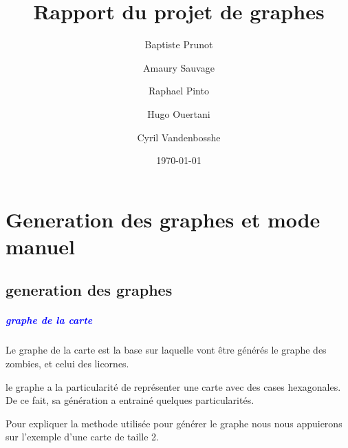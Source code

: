 \documentclass{report}
\title{Rapport du projet de graphes}
\author{Baptiste Prunot
\and Amaury Sauvage
\and Raphael Pinto
\and Hugo Ouertani
\and Cyril Vandenbosshe}
\date{\today}
\begin{document}
	\maketitle 
	
	\chapter{Generation des graphes et mode manuel}
		\section{generation des graphes}
			
			\paragraph{\textcolor{blue}{graphe de la carte}}
			Le graphe de la carte est la base sur laquelle vont \^etre g\'en\'er\'es le graphe des zombies, et celui des licornes.
			
			le graphe a la particularit\'e de repr\'esenter une carte avec des cases hexagonales. De ce fait, sa g\'en\'eration a entrain\'e quelques particularit\'es.
			
			Pour expliquer la methode utilis\'ee pour g\'en\'erer le graphe nous nous appuierons sur l'exemple d'une carte de taille 2.
			
			\begin{center}
			\end{center}
			
\end{document}
